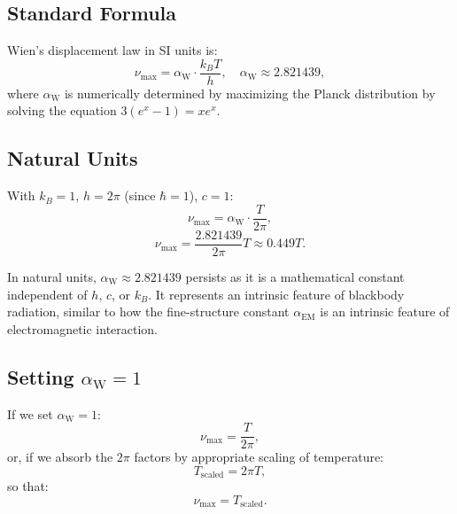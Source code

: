 \documentclass[12pt,a4paper]{article}
\newcommand{\alphaEM}{\alpha_{\text{EM}}}
\newcommand{\alphaW}{\alpha_{\text{W}}}
\begin{document}
	\subsection{Standard Formula}
	\label{subsec:standard_formula}
	
	Wien's displacement law in SI units is:
	\[
	\nu_{\text{max}} = \alphaW \cdot \frac{k_B T}{h}, \quad \alphaW \approx 2.821439,
	\]
	where \(\alphaW\) is numerically determined by maximizing the Planck distribution by solving the equation \(3 (e^x - 1) = x e^x\).
	
	\subsection{Natural Units}
	\label{subsec:natural_units}
	
	With \(k_B = 1\), \(h = 2\pi\) (since \(\hbar = 1\)), \(c = 1\):
	\[
	\nu_{\text{max}} = \alphaW \cdot \frac{T}{2\pi},
	\]
	\[
	\nu_{\text{max}} = \frac{2.821439}{2\pi} T \approx 0.449 T.
	\]
	
	In natural units, \(\alphaW \approx 2.821439\) persists as it is a mathematical constant independent of \(h\), \(c\), or \(k_B\). It represents an intrinsic feature of blackbody radiation, similar to how the fine-structure constant \(\alphaEM\) is an intrinsic feature of electromagnetic interaction.
	
	\subsection{Setting \(\alphaW = 1\)}
	\label{subsec:setting_alpha_w}
	
	If we set \(\alphaW = 1\):
	\[
	\nu_{\text{max}} = \frac{T}{2\pi},
	\]
	or, if we absorb the \(2\pi\) factors by appropriate scaling of temperature:
	\[
	T_{\text{scaled}} = 2\pi T,
	\]
	so that:
	\[
	\nu_{\text{max}} = T_{\text{scaled}}.
	\]
	
\end{document}
